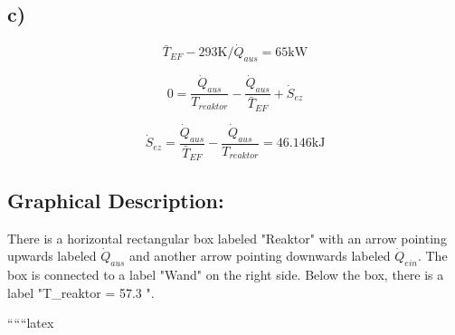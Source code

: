 

\subsection*{c)}

\[
\bar{T}_{EF} - 293 \text{K} / \dot{Q}_{aus} = 65 \text{kW}
\]

\[
0 = \frac{\dot{Q}_{aus}}{T_{reaktor}} - \frac{\dot{Q}_{aus}}{\bar{T}_{EF}} + \dot{S}_{ez}
\]

\[
\dot{S}_{ez} = \frac{\dot{Q}_{aus}}{\bar{T}_{EF}} - \frac{\dot{Q}_{aus}}{T_{reaktor}} = 46.146 \text{kJ}
\]

\subsection*{Graphical Description:}

There is a horizontal rectangular box labeled "Reaktor" with an arrow pointing upwards labeled $\dot{Q}_{aus}$ and another arrow pointing downwards labeled $\dot{Q}_{ein}$. The box is connected to a label "Wand" on the right side. Below the box, there is a label "T_{reaktor} = 57.3 ".

``````latex